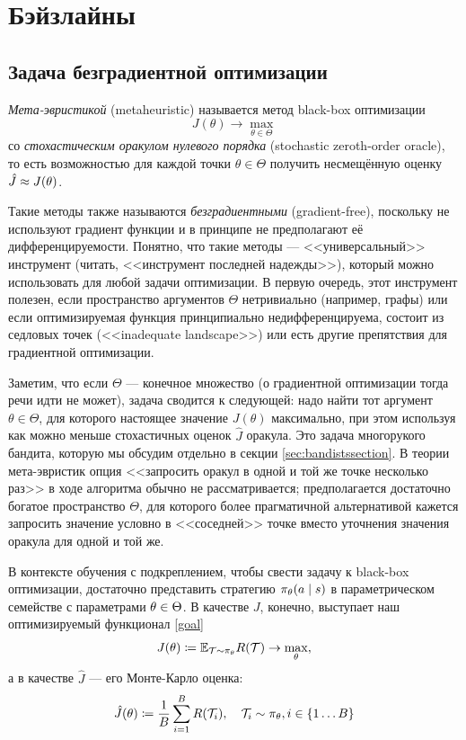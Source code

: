\section{Бэйзлайны}

\subsection{Задача безградиентной оптимизации}

\begin{definition}
\emph{Мета-эвристикой} (metaheuristic) называется метод black-box оптимизации
$$J(\theta) \to \max_{\theta \in \Theta}$$
со \emph{стохастическим оракулом нулевого порядка} (stochastic zeroth-order oracle), то есть возможностью для каждой точки $\theta \in \Theta$ получить несмещённую оценку $\hat{J} \HM\approx J(\theta)$.
\end{definition}

Такие методы также называются \emph{безградиентными} (gradient-free), поскольку не используют градиент функции и в принципе не предполагают её дифференцируемости. Понятно, что такие методы --- <<универсальный>> инструмент (читать, <<инструмент последней надежды>>), который можно использовать для любой задачи оптимизации. В первую очередь, этот инструмент полезен, если пространство аргументов $\Theta$ нетривиально (например, графы) или если оптимизируемая функция принципиально недифференцируема, состоит из седловых точек (<<inadequate landscape>>) или есть другие препятствия для градиентной оптимизации.

Заметим, что если $\Theta$ --- конечное множество (о градиентной оптимизации тогда речи идти не может), задача сводится к следующей: надо найти тот аргумент $\theta \in \Theta$, для которого настоящее значение $J(\theta)$ максимально, при этом используя как можно меньше стохастичных оценок $\hat{J}$ оракула. Это задача многорукого бандита, которую мы обсудим отдельно в секции \ref{sec:bandistssection}. В теории мета-эвристик опция <<запросить оракул в одной и той же точке несколько раз>> в ходе алгоритма обычно не рассматривается; предполагается достаточно богатое пространство $\Theta$, для которого более прагматичной альтернативой кажется запросить значение условно в <<соседней>> точке вместо уточнения значения оракула для одной и той же.

В контексте обучения с подкреплением, чтобы свести задачу к black-box оптимизации, достаточно представить стратегию $\pi_\theta(a \HM\mid s)$ в параметрическом семействе с параметрами $\theta \HM\in \Theta$. В качестве $J$, конечно, выступает наш оптимизируемый функционал \eqref{goal}
$$J(\theta) \coloneqq \mathbb{E}_{\mathcal{T} \sim \pi_\theta} R(\mathcal{T}) \to \max_{\theta},$$
а в качестве $\hat{J}$ --- его Монте-Карло оценка:
$$\hat{J}(\theta) \coloneqq \frac{1}{B}\sum_{i=1}^{B} R(\mathcal{T}_i), \quad \mathcal{T}_i \sim \pi_\theta, i \in \{1 \dots B \}$$

